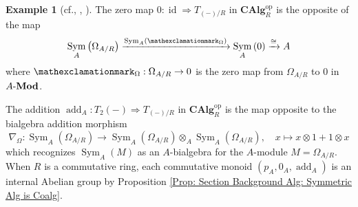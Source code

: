\documentclass{amsart}
\theoremstyle{definition}
\newtheorem{example}[equation]{Example}
\newcommand{\bang}{\mathexclamationmark}
\DeclareMathOperator{\sym}{Sym}
\DeclareMathOperator{\id}{id}
\DeclareMathOperator{\op}{op}
\newcommand{\CAlg}[1]{\mathbf{CAlg}_{#1}}
\newcommand{\Sym}[1]{\sym_{#1}}
\newcommand{\Mod}[1]{{#1}\textnormal{-}\mathbf{Mod}}
\newcommand{\Kah}[2]{\Omega_{{#1}/{#2}}}
\numberwithin{equation}{subsection}
\begin{document}
\begin{example}[{cf.\@ \cite[Example 4.2]{GeoffJSDiffBunComAlg}, \cite{RobinMePartialMapRigs}, \cite{JSMeMapFlavoursInTanCats}}]
	The zero map $0:\id \Rightarrow T_{(-)/R}$ in $\CAlg{R}^{\op}$ is the opposite of the map
	\begin{equation}\label{Eqn: Section Tangent: Tangent Structure of Affine Zero Map}
	\Sym{A}\left(\Kah{A}{R}\right) \xrightarrow{\Sym{A}(\bang_{\Omega})} \Sym{A}\left(0\right) \xrightarrow{\cong} A
	\end{equation}
	where $\bang_{\Omega}:\Kah{A}{R} \to 0$ is the zero map from $\Kah{A}{R}$ to $0$ in $\Mod{A}$.
	
	The addition $\operatorname{add}_A:T_2(-) \Rightarrow T_{(-)/R}$ in $\CAlg{R}^{\op}$ is the map opposite to the bialgebra addition morphism
	\[
	\nabla_{\Omega}:\Sym{A}\left(\Kah{A}{R}\right) \to \Sym{A}\left(\Kah{A}{R}\right)  \otimes_A \Sym{A}\left(\Kah{A}{R}\right), \quad x \mapsto x \otimes 1 + 1 \otimes x
	\]
	which  recognizes $\Sym{A}(M)$ as an $A$-bialgebra for the $A$-module $M = \Kah{A}{R}$. When $R$ is a commutative ring, each commutative monoid $(p_A, 0_A, \operatorname{add}_A)$ is an internal Abelian group by Proposition \ref{Prop: Section Background Alg: Symmetric Alg is Coalg}.
	

\end{example}
\end{document}
